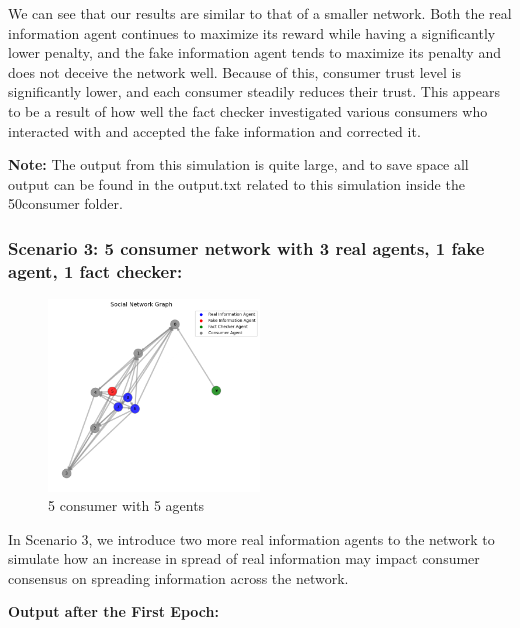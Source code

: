 \documentclass[twoside]{article}
\begin{document}
 We can see that our results are similar to that of a smaller network. Both the real information agent continues to maximize its reward while having a significantly lower penalty, and the fake information agent tends to maximize its penalty and does not deceive the network well. Because of this, consumer trust level is significantly lower, and each consumer steadily reduces their trust. This appears to be a result of how well the fact checker investigated various consumers who interacted with and accepted the fake information and corrected it.

 \textbf{Note: } The output from this simulation is quite large, and to save space all output can be found in the output.txt related to this simulation inside the 50consumer folder.

 \pagebreak
 \subsubsection{Scenario 3: 5 consumer network with 3 real agents, 1 fake agent, 1 fact checker:}
 
 \begin{figure}[htbp]
     \centering
     \includegraphics[width=0.5\textwidth]{../results/multi_real_agent/initial.png}
     \caption{5 consumer with 5 agents}
     \label{fig: 5 consumer, 5 agents}
 \end{figure}

In Scenario 3, we introduce two more real information agents to the network to simulate how an increase in spread of real information may impact consumer consensus on spreading information across the network.

\textbf{Output after the First Epoch: }
\end{document}
